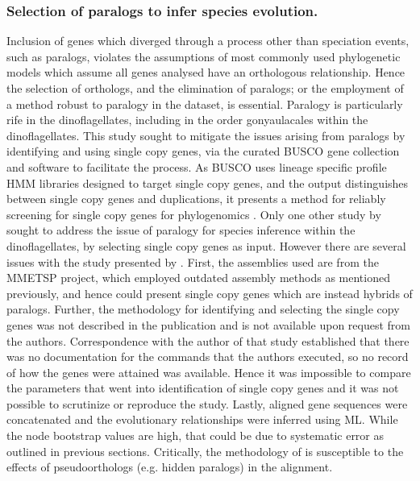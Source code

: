 \documentclass[fleqn,10pt,lineno]{wlpeerj} %
\begin{document}
\subsubsection*{Selection of paralogs to infer species evolution.}
Inclusion of genes which diverged through a process other than speciation events, such as paralogs, violates the assumptions of most commonly used phylogenetic models which assume all genes analysed have an orthologous relationship.
Hence the selection of orthologs, and the elimination of paralogs; or the employment of a method robust to paralogy in the dataset, is essential.
Paralogy is particularly rife in the dinoflagellates, including in the order gonyaulacales within the dinoflagellates. 
This study sought to mitigate the issues arising from paralogs by identifying and using single copy genes, via the curated BUSCO gene collection and software to facilitate the process. 
As BUSCO uses lineage specific profile HMM libraries designed to target single copy genes, and the output distinguishes between single copy genes and duplications, it presents a method for reliably screening for single copy genes for phylogenomics \citep{waterhouse2017busco}.
Only one other study by \cite{price2017robust} sought to address the issue of paralogy for species inference within the dinoflagellates, by selecting single copy genes as input. 
However there are several issues with the study presented by \cite{price2017robust}. 
First, the assemblies used are from the MMETSP project, which employed outdated assembly methods as mentioned previously, and hence could present single copy genes which are instead hybrids of paralogs. 
Further, the methodology for identifying and selecting the single copy genes was not described in the publication and is not available upon request from the authors. 
Correspondence with the author of that study established that there was no documentation for the commands that the authors executed, so no record of how the genes were attained was available. 
Hence it was impossible to compare the parameters that went into identification of single copy genes and it was not possible to scrutinize or reproduce the study.
Lastly, \cite{price2017robust} aligned gene sequences were concatenated and the evolutionary relationships were inferred using ML. 
While the node bootstrap values are high, that could be due to systematic error as outlined in previous sections.
Critically, the methodology of \cite{price2017robust} is susceptible to the effects of pseudoorthologs (e.g. hidden paralogs) in the alignment.
\end{document}

